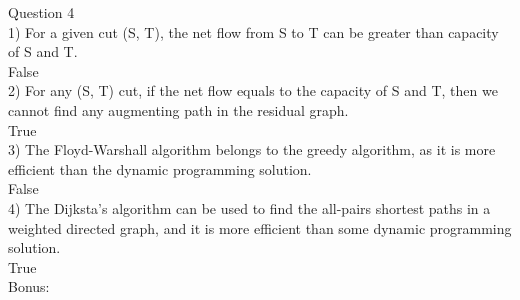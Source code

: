 \documentclass{article}
\begin{document}



Question 4\\
1) For a given cut (S, T), the net flow from S to T can be greater than capacity of S and T.\\
False\\
2) For any (S, T) cut, if the net flow equals to the capacity of S and T, then we cannot find any augmenting path in the residual graph.\\
True\\
3) The Floyd-Warshall algorithm belongs to the greedy algorithm, as it is more efficient than the dynamic programming solution.\\
False\\
4) The Dijksta's algorithm can be used to find the all-pairs shortest paths in a weighted directed graph, and it is more efficient than some dynamic programming solution.\\
True\\

Bonus:
\end{document}
